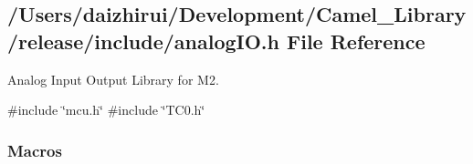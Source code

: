 \hypertarget{a00002}{}\subsection{/\+Users/daizhirui/\+Development/\+Camel\+\_\+\+Library/release/include/analog\+IO.h File Reference}
\label{a00002}


Analog Input Output Library for M2.  


{\ttfamily \#include \char`\"{}mcu.\+h\char`\"{}}\newline
{\ttfamily \#include \char`\"{}T\+C0.\+h\char`\"{}}\newline
\subsubsection*{Macros}
